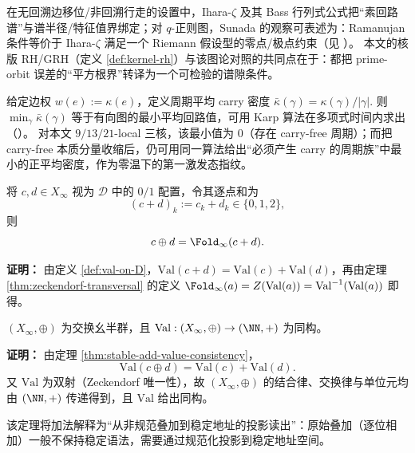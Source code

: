 \begin{remark}\label{rem:kernel-graph-rh}
在无回溯边移位/非回溯行走的设置中，Ihara-\(\zeta\) 及其 Bass 行列式公式把“素回路谱”与谱半径/特征值界绑定；对 $q$-正则图，Sunada 的观察可表述为：Ramanujan 条件等价于 Ihara-\(\zeta\) 满足一个 Riemann 假设型的零点/极点约束（见 \cite{TerrasZetaGraphs,StarkTerras1996GraphCoverings}）。
本文的核版 RH/GRH（定义 \ref{def:kernel-rh}）与该图论对照的共同点在于：都把 prime-orbit 误差的“平方根界”转译为一个可检验的谱隙条件。
\end{remark}

\begin{remark}\label{rem:kernel-min-cycle-mean}
给定边权 $w(e):=\kappa(e)$，定义周期平均 carry 密度
\(
\bar\kappa(\gamma)=\kappa(\gamma)/|\gamma|.
\)
则 $\min_{\gamma}\bar\kappa(\gamma)$ 等于有向图的最小平均回路值，可用 Karp 算法在多项式时间内求出（\cite{Karp1978MinCycleMean}）。
对本文 $9/13/21$-local 三核，该最小值为 $0$（存在 carry-free 周期）；而把 carry-free 本质分量收缩后，仍可用同一算法给出“必须产生 carry 的周期族”中最小的正平均密度，作为零温下的第一激发态指纹。
\end{remark}

\begin{corollary}\label{cor:add-as-fold}
将 $c,d\in X_\infty$ 视为 $\mathcal{D}$ 中的 $0/1$ 配置，令其逐点和为
\[
(c+d)_k:=c_k+d_k\in\{0,1,2\},
\]
则
\[
c\oplus d=\Fold_\infty(c+d).
\]
\end{corollary}

\textbf{证明：}
由定义 \ref{def:val-on-D}，$\mathrm{Val}(c+d)=\mathrm{Val}(c)+\mathrm{Val}(d)$，再由定理 \ref{thm:zeckendorf-transversal} 的定义 $\Fold_\infty(a)=Z(\mathrm{Val}(a))=\mathrm{Val}^{-1}(\mathrm{Val}(a))$ 即得。

\begin{theorem}\label{thm:add-definitional}
$(X_\infty,\oplus)$ 为交换幺半群，且 $\mathrm{Val}:(X_\infty,\oplus)\to(\NN,+)$ 为同构。
\end{theorem}

\textbf{证明：}
由定理 \ref{thm:stable-add-value-consistency}，
\[
\mathrm{Val}(c\oplus d)=\mathrm{Val}(c)+\mathrm{Val}(d).
\]
又 \(\mathrm{Val}\) 为双射（Zeckendorf 唯一性），故 \((X_\infty,\oplus)\) 的结合律、交换律与单位元均由 \((\NN,+)\) 传递得到，且 \(\mathrm{Val}\) 给出同构。

该定理将加法解释为“从非规范叠加到稳定地址的投影读出”：原始叠加（逐位相加）一般不保持稳定语法，需要通过规范化投影到稳定地址空间。
